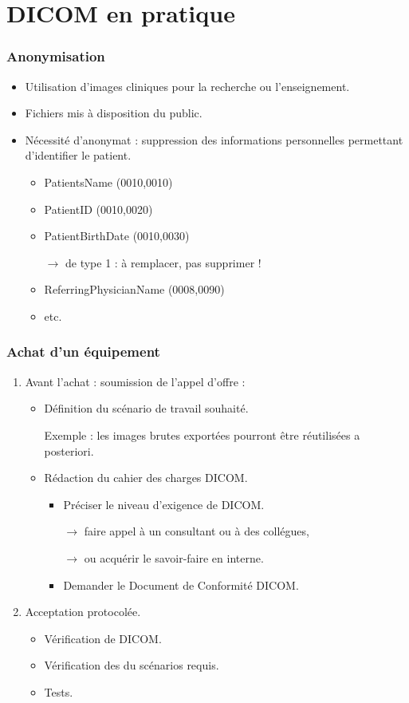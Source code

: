 \section{DICOM en pratique}

\frame
{
	\frametitle{Anonymisation}
	\begin{itemize}
		\item<1-> Utilisation d'images cliniques pour la recherche ou l'enseignement.
		\item<2-> Fichiers mis \`a disposition du public.
		\item<3-> N\'ecessit\'e d'anonymat : suppression des informations personnelles permettant d'identifier le patient.
		\begin{itemize}
			\item<4-> PatientsName (0010,0010)
			\item<5-> PatientID (0010,0020)
			\item<6-> PatientBirthDate (0010,0030)
			
			$\rightarrow$ de type 1 : \`a remplacer, pas supprimer !
			\item<7-> ReferringPhysicianName (0008,0090)
			\item<8-> etc.
		\end{itemize}
	\end{itemize}
}

\frame
{
	\frametitle{Achat d'un \'equipement}
	\begin{enumerate}
		\item<1-> Avant l'achat : soumission de l'appel d'offre :
		\begin{itemize}
			\item<2-> D\'efinition du sc\'enario de travail souhait\'e.
			
			Exemple : les images brutes export\'ees pourront \^etre r\'eutilis\'ees a posteriori.
			\item<3-> R\'edaction du cahier des charges DICOM.
			\begin{itemize}
				\item<4-> Pr\'eciser le niveau d'exigence de DICOM.
				
				$\rightarrow$ faire appel \`a un consultant ou \`a des coll\'egues,
				
				$\rightarrow$ ou acqu\'erir le savoir-faire en interne.
				\item<5-> Demander le Document de Conformit\'e DICOM.
			\end{itemize}
		\end{itemize}
		\item<6-> Acceptation protocol\'ee.
		\begin{itemize}
			\item<7-> V\'erification de DICOM.
			\item<8-> V\'erification des du sc\'enarios requis.
			\item<9-> Tests.
		\end{itemize}
	\end{enumerate}
}

